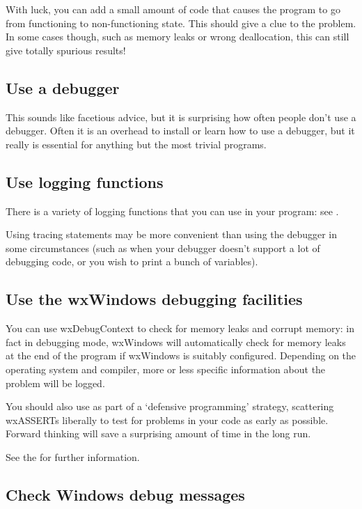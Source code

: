 With luck, you can add a small amount of code that causes the program
to go from functioning to non-functioning state. This should give a clue
to the problem. In some cases though, such as memory leaks or wrong
deallocation, this can still give totally spurious results!

\subsection{Use a debugger}

This sounds like facetious advice, but it is surprising how often people
don't use a debugger. Often it is an overhead to install or learn how to
use a debugger, but it really is essential for anything but the most
trivial programs.

\subsection{Use logging functions}

There is a variety of logging functions that you can use in your program:
see .

Using tracing statements may be more convenient than using the debugger
in some circumstances (such as when your debugger doesn't support a lot
of debugging code, or you wish to print a bunch of variables).

\subsection{Use the wxWindows debugging facilities}

You can use wxDebugContext to check for
memory leaks and corrupt memory: in fact in debugging mode, wxWindows will
automatically check for memory leaks at the end of the program if wxWindows is suitably
configured. Depending on the operating system and compiler, more or less
specific information about the problem will be logged.

You should also use  as part of a `defensive programming' strategy,
scattering wxASSERTs liberally to test for problems in your code as early as possible. Forward thinking
will save a surprising amount of time in the long run.

See the  for further information.

\subsection{Check Windows debug messages}

